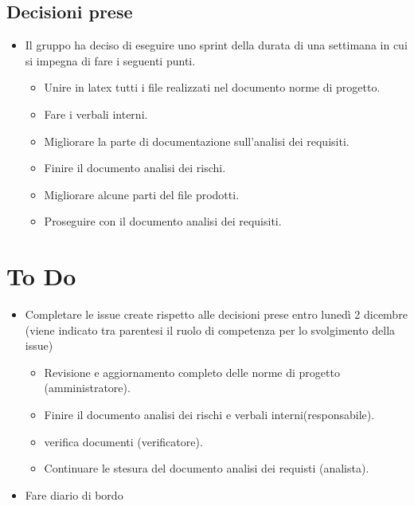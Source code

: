 \documentclass[a4paper, 12pt]{article}
\begin{document}
\subsection{Decisioni prese}
\begin{itemize}
    \item Il gruppo ha deciso di eseguire uno sprint della durata di una settimana in cui si impegna di fare i seguenti punti.
    \begin{itemize}
        \item Unire in latex tutti i file realizzati nel documento norme di progetto.
        \item Fare i verbali interni.
        \item Migliorare la parte di documentazione sull'analisi dei requisiti.
        \item Finire il documento analisi dei rischi.
        \item Migliorare alcune parti del file prodotti.
        \item Proseguire con il documento analisi dei requisiti.
    \end{itemize}
\end{itemize}

\section{To Do}
    \begin{itemize}
        \item Completare le issue create rispetto alle decisioni prese entro lunedì 2 dicembre (viene indicato tra parentesi il ruolo di competenza per lo svolgimento della issue)
        \begin{itemize}
            \item Revisione e aggiornamento completo delle norme di progetto (amministratore).
            \item Finire il documento analisi dei rischi e verbali interni(responsabile).
            \item verifica documenti (verificatore).
            \item Continuare le stesura del documento analisi dei requisti (analista).
        \end{itemize}
        \item Fare diario di bordo
    \end{itemize}
\end{document}
